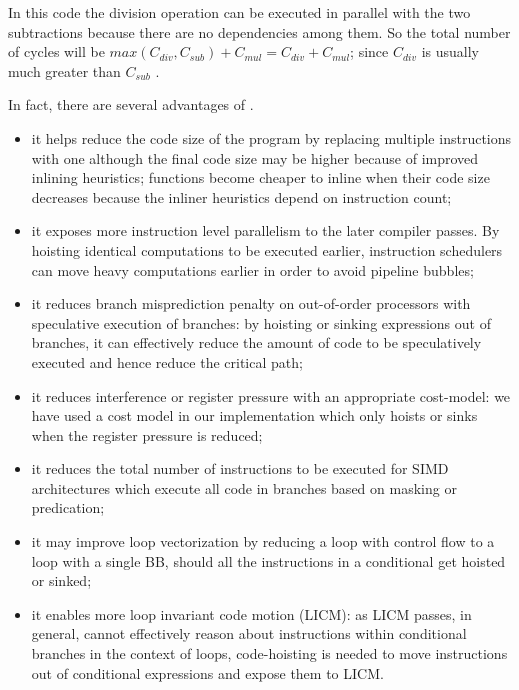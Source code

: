 \documentclass[acmlarge,review,anonymous]{acmart}\settopmatter{printfolios=true}
\begin{document}
In this code the division operation can be executed in parallel with the two
subtractions because there are no dependencies among them. So the total number
of cycles will be $max(C_{div}, C_{sub}) + C_{mul} = C_{div} + C_{mul}$; since
$C_{div}$ is usually much greater than $C_{sub}$ \cite{x86,aarch64}.


In fact, there are several advantages of \GCM{}.
\begin{itemize}
\item it helps reduce the code size of the program by replacing multiple
  instructions with one although the final code size may be higher because of
  improved inlining heuristics; functions become cheaper to inline when their
  code size decreases because the inliner heuristics depend on instruction
  count;
\item it exposes more instruction level parallelism to the later compiler
  passes. By hoisting identical computations to be executed earlier, instruction
  schedulers can move heavy computations earlier in order to avoid pipeline
  bubbles;
\item it reduces branch misprediction penalty on out-of-order processors with
  speculative execution of branches: by hoisting or sinking expressions out of
  branches, it can effectively reduce the amount of code to be speculatively
  executed and hence reduce the critical path;
\item it reduces interference or register pressure with an appropriate
  cost-model: we have used a cost model in our implementation which only hoists
  or sinks when the register pressure is reduced;
\item it reduces the total number of instructions to be executed for SIMD
  architectures which execute all code in branches based on masking or
  predication;
\item it may improve loop vectorization by reducing a loop with control flow to
  a loop with a single BB, should all the instructions in a conditional get
  hoisted or sinked;
\item it enables more loop invariant code motion (LICM): as LICM passes, in
  general, cannot effectively reason about instructions within conditional
  branches in the context of loops, code-hoisting is needed to move instructions
  out of conditional expressions and expose them to LICM.
\end{itemize}
\end{document}
